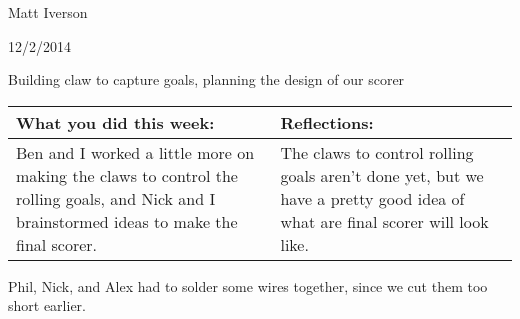 Matt Iverson

12/2/2014

Building claw to capture goals, planning the design of our scorer

\begin{tabular}{|p{5cm}|p{5cm}|}
 \hline
 What you did this week:
 &
 Reflections:
 \\
 \hline
 Ben and I worked a little more on making the claws to control the rolling goals, and Nick and I brainstormed ideas to make the final scorer.
 &
 The claws to control rolling goals aren't done yet, but we have a pretty good idea of what are final scorer will look like.
 \\
 \hline
\end{tabular}


Phil, Nick, and Alex had to solder some wires together, since we cut them too short earlier.
